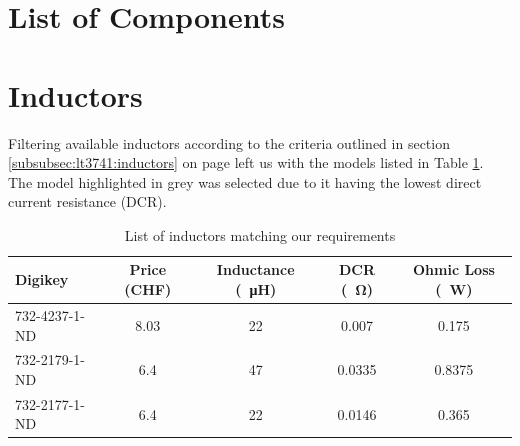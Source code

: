 \setlength\paperheight{297mm}
\setlength\paperwidth{420mm}
\setlength\pdfpageheight{\paperheight}
\setlength\pdfpagewidth{\paperwidth}

    \section{List of Components}
    \label{appendix:components}
    

\setlength\paperheight{210mm}
\setlength\paperwidth{297mm}
\setlength\pdfpageheight{\paperheight}
\setlength\pdfpagewidth{\paperwidth}




\clearpage
\section{Inductors}
\label{appendix:inductors}

Filtering available  inductors according to  the criteria outlined  in section
\ref{subsubsec:lt3741:inductors} on  page \pageref{subsubsec:lt3741:inductors}
left us  with the models listed  in Table \ref{tab:circuit:buck:inductor}. The
model highlighted  in grey  was selected  due to it  having the  lowest direct
current resistance (DCR).

\begin{table}[th!]
    \begin{center}
        \caption{List of inductors matching our requirements}
        \label{tab:circuit:buck:inductor}
        \begin{tabular}{lcccc}
            \toprule
            Digikey         & Price (CHF) & Inductance (\SI{}{\micro\henry}) & DCR (\SI{}{\ohm}) & Ohmic Loss (\SI{}{\watt}) \\
            \midrule
            \rowcolor{lightgray}
            732-4237-1-ND   & 8.03        & 22                               & 0.007             & 0.175  \\
            732-2179-1-ND   & 6.4         & 47                               & 0.0335            & 0.8375 \\
            732-2177-1-ND   & 6.4         & 22                               & 0.0146            & 0.365  \\
            \bottomrule
        \end{tabular}
    \end{center}
\end{table}


